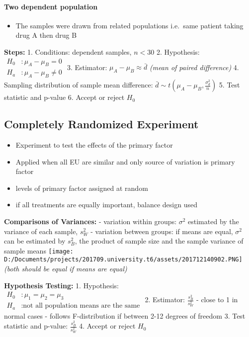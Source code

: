 \documentclass[11pt]{article}
\makeatletter
\def\maxwidth{\ifdim\Gin@nat@width>\linewidth\linewidth
    \else\Gin@nat@width\fi}
\let\Oldincludegraphics\includegraphics
\renewcommand{\includegraphics}[1]{\Oldincludegraphics[width=.8\maxwidth]{#1}}
\providecommand{\tightlist}{%
      \setlength{\itemsep}{0pt}\setlength{\parskip}{0pt}}
\makeatother
\begin{document}
\hypertarget{two-dependent-population}{%
\paragraph{Two dependent population}\label{two-dependent-population}}

\begin{itemize}
\tightlist
\item
  The samples were drawn from related populations i.e.~same patient
  taking drug A then drug B
\end{itemize}

\textbf{Steps:} 1. Conditions: dependent samples, \(n < 30\) 2.
Hypothesis:
\(\begin{aligned}H_0&:\mu_A-\mu_B=0\\H_a&:\mu_A-\mu_B\neq0\end{aligned}\)
3. Estimator: \(\mu_A-\mu_B\approx\bar d\) \emph{(mean of paired
difference)} 4. Sampling distribution of sample mean difference:
\(\bar d\sim t\left(\mu_A-\mu_B, \frac{\sigma_d^2}{n}\right)\) 5. Test
statistic and p-value 6. Accept or reject \(H_0\)

\hypertarget{completely-randomized-experiment}{%
\subsection{Completely Randomized
Experiment}\label{completely-randomized-experiment}}

\begin{itemize}
\tightlist
\item
  Experiment to test the effects of the primary factor
\item
  Applied when all EU are similar and only source of variation is
  primary factor
\item
  levels of primary factor assigned at random
\item
  if all treatments are equally important, balance design used
\end{itemize}

\textbf{Comparisons of Variances:} - variation within groups:
\(\sigma^2\) estimated by the variance of each sample, \(s^2_W\) -
variation between groups: if means are equal, \(\sigma^2\) can be
estimated by \(s^2_B\), the product of sample size and the sample
variance of sample means
\texttt{[image: D:/Documents/projects/201709.university.t6/assets/201712140902.PNG]}
\emph{(both should be equal if means are equal)}

\textbf{Hypothesis Testing:} 1. Hypothesis:
\(\begin{aligned}H_0&:\mu_1=\mu_2=\mu_3\\H_a&:\text{not all population means are the same}\end{aligned}\)
2. Estimator: \(\frac{s_B^2}{s_W^2}\) - close to 1 in normal cases -
follows F-distribution if between 2-12 degrees of freedom 3. Test
statistic and p-value: \(\frac{s_B^2}{s_W^2}\) 4. Accept or reject
\(H_0\)
\end{document}
